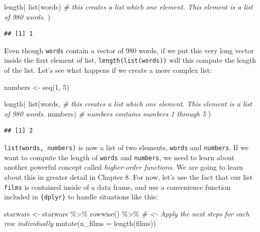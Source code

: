 \documentclass[
]{article}
\newenvironment{Shaded}{\begin{snugshade}}{\end{snugshade}}
\newcommand{\AttributeTok}[1]{\textcolor[rgb]{0.77,0.63,0.00}{#1}}
\newcommand{\CommentTok}[1]{\textcolor[rgb]{0.56,0.35,0.01}{\textit{#1}}}
\newcommand{\DecValTok}[1]{\textcolor[rgb]{0.00,0.00,0.81}{#1}}
\newcommand{\FunctionTok}[1]{\textcolor[rgb]{0.00,0.00,0.00}{#1}}
\newcommand{\NormalTok}[1]{#1}
\newcommand{\OtherTok}[1]{\textcolor[rgb]{0.56,0.35,0.01}{#1}}
\newcommand{\SpecialCharTok}[1]{\textcolor[rgb]{0.00,0.00,0.00}{#1}}
\begin{document}
\begin{Shaded}
\begin{Highlighting}[]
\FunctionTok{length}\NormalTok{(}
  \FunctionTok{list}\NormalTok{(words) }\CommentTok{\# this creates a list which one element. This element is a list of 980 words.}
\NormalTok{)}
\end{Highlighting}
\end{Shaded}

\begin{verbatim}
## [1] 1
\end{verbatim}

Even though \texttt{words} contain a vector of 980 words, if we put this very long vector inside the
first element of list, \texttt{length(list(words))} will this compute the length of the list. Let's
see what happens if we create a more complex list:

\begin{Shaded}
\begin{Highlighting}[]
\NormalTok{numbers }\OtherTok{\textless{}{-}} \FunctionTok{seq}\NormalTok{(}\DecValTok{1}\NormalTok{, }\DecValTok{5}\NormalTok{)}

\FunctionTok{length}\NormalTok{(}
  \FunctionTok{list}\NormalTok{(words, }\CommentTok{\# this creates a list which one element. This element is a list of 980 words.}
\NormalTok{       numbers) }\CommentTok{\# numbers contains numbers 1 through 5}
\NormalTok{)}
\end{Highlighting}
\end{Shaded}

\begin{verbatim}
## [1] 2
\end{verbatim}

\texttt{list(words,\ numbers)} is now a list of two elements, \texttt{words} and \texttt{numbers}. If we want to compute
the length of \texttt{words} and \texttt{numbers}, we need to learn about another powerful concept called
\emph{higher-order functions}. We are going to learn about this in greater detail in Chapter 8. For now,
let's use the fact that our list \texttt{films} is contained inside of a data frame, and use a convenience
function included in \texttt{\{dplyr\}} to handle situations like this:

\begin{Shaded}
\begin{Highlighting}[]
\NormalTok{starwars }\OtherTok{\textless{}{-}}\NormalTok{ starwars }\SpecialCharTok{\%\textgreater{}\%}
  \FunctionTok{rowwise}\NormalTok{() }\SpecialCharTok{\%\textgreater{}\%} \CommentTok{\# \textless{}{-} Apply the next steps for each row individually}
  \FunctionTok{mutate}\NormalTok{(}\AttributeTok{n\_films =} \FunctionTok{length}\NormalTok{(films))}
\end{Highlighting}
\end{Shaded}
\end{document}
